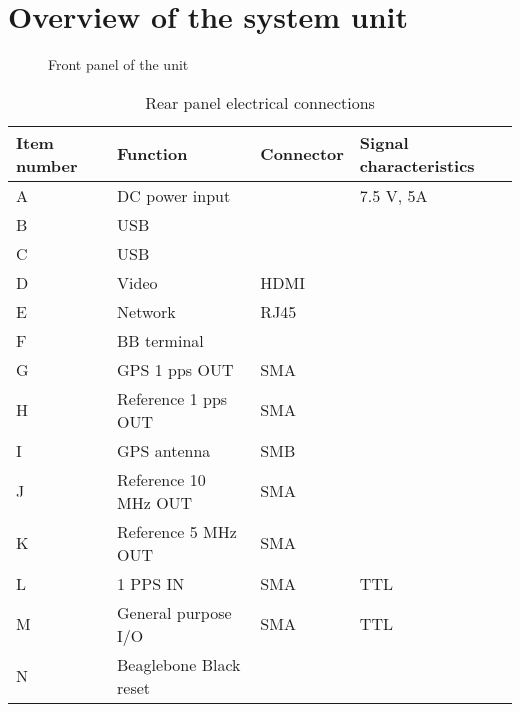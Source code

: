 
\section{Overview of the system unit}


\begin{figure}[h]
\caption{Front panel of the unit}
\end{figure}

\begin{table}
	\begin{tabular}{llll}
	Item number & Function & Connector & Signal characteristics \\ \hline
	A & DC power input & & 7.5 V, 5A \\
	B & USB & & \\
	C & USB & & \\
	D & Video & HDMI & \\
	E & Network & RJ45 & \\
	F & BB terminal & & \\
	G & GPS 1 pps OUT & SMA & \\
	H & Reference 1 pps OUT & SMA & \\
	I & GPS antenna & SMB & \\
	J & Reference 10 MHz OUT& SMA & \\
	K & Reference 5 MHz OUT & SMA & \\
	L & 1 PPS IN & SMA & TTL\\
	M & General purpose I/O & SMA & TTL \\
	N & Beaglebone Black reset & &
	\end{tabular}
	\caption{Rear panel electrical connections}
\end{table}